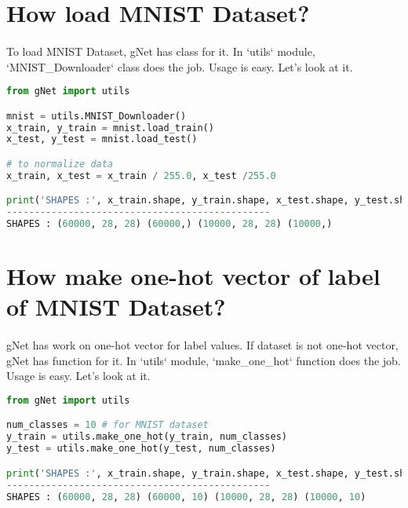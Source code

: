 \documentclass[12pt]{report}
\begin{document}
\section{How load MNIST Dataset?}
\paragraph{}
To load MNIST Dataset, gNet has class for it. In `utils` module, `MNIST\_Downloader` class does the job. Usage is easy. Let's look at it.

\begin{lstlisting}[language=Python, numbers=none, caption={Load MNIST Dataset.}, label={ex:mnist-load}]
from gNet import utils

mnist = utils.MNIST_Downloader()
x_train, y_train = mnist.load_train()
x_test, y_test = mnist.load_test()

# to normalize data
x_train, x_test = x_train / 255.0, x_test /255.0

print('SHAPES :', x_train.shape, y_train.shape, x_test.shape, y_test.shape)
-----------------------------------------------
SHAPES : (60000, 28, 28) (60000,) (10000, 28, 28) (10000,)
\end{lstlisting}



\section{How make one-hot vector of label of MNIST Dataset?}
\paragraph{}
gNet has work on one-hot vector for label values. If dataset is not one-hot vector, gNet has function for it. In `utils` module, `make\_one\_hot` function does the job. Usage is easy. Let's look at it.

\begin{lstlisting}[language=Python, numbers=none, caption={Making one-hot vector of label of dataset.}, label={ex:make-one-hot}]
from gNet import utils

num_classes = 10 # for MNIST dataset
y_train = utils.make_one_hot(y_train, num_classes)
y_test = utils.make_one_hot(y_test, num_classes)

print('SHAPES :', x_train.shape, y_train.shape, x_test.shape, y_test.shape)
-----------------------------------------------
SHAPES : (60000, 28, 28) (60000, 10) (10000, 28, 28) (10000, 10)
\end{lstlisting}
\end{document}

